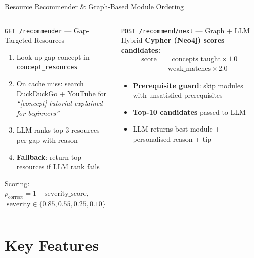 \documentclass[aspectratio=169,9pt]{beamer}
\begin{document}
\begin{frame}{Resource Recommender \& Graph-Based Module Ordering}
\begin{columns}[T]
  \begin{block}{\texttt{GET /recommender} — Gap-Targeted Resources}
    \begin{enumerate}
      \item Look up gap concept in \texttt{concept\_resources}
      \item On cache miss: search DuckDuckGo + YouTube for\\\textit{``[concept] tutorial explained for beginners''}
      \item LLM ranks top-3 resources per gap with reason
      \item \textbf{Fallback}: return top resources if LLM rank fails
    \end{enumerate}
    \medskip
    Scoring: $p_{\text{correct}} = 1 - \text{severity\_score}$, $\;\text{severity} \in \{0.85, 0.55, 0.25, 0.10\}$
  \end{block}

  \begin{block}{\texttt{POST /recommend/next} — Graph + LLM Hybrid}
    \small
    \textbf{Cypher (Neo4j) scores candidates:}
    \begin{align*}
      \text{score} &= \text{concepts\_taught} \times 1.0 \\
                   &+ \text{weak\_matches} \times 2.0
    \end{align*}

    \begin{itemize}
      \item \textbf{Prerequisite guard}: skip modules with unsatisfied prerequisites
      \item \textbf{Top-10 candidates} passed to LLM
      \item LLM returns best module + personalised reason + tip
    \end{itemize}
  \end{block}
\end{columns}
\end{frame}

\section{Key Features}
\end{document}
